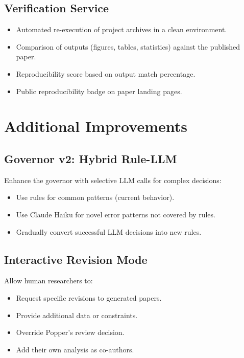 \subsection{Verification Service}

\begin{itemize}
  \item Automated re-execution of project archives in a clean environment.
  \item Comparison of outputs (figures, tables, statistics) against the published paper.
  \item Reproducibility score based on output match percentage.
  \item Public reproducibility badge on paper landing pages.
\end{itemize}

\section{Additional Improvements}
\label{sec:improve:additional}

\subsection{Governor v2: Hybrid Rule-LLM}

Enhance the governor with selective LLM calls for complex decisions:
\begin{itemize}
  \item Use rules for common patterns (current behavior).
  \item Use Claude Haiku for novel error patterns not covered by rules.
  \item Gradually convert successful LLM decisions into new rules.
\end{itemize}

\subsection{Interactive Revision Mode}

Allow human researchers to:
\begin{itemize}
  \item Request specific revisions to generated papers.
  \item Provide additional data or constraints.
  \item Override Popper's review decision.
  \item Add their own analysis as co-authors.
\end{itemize}


